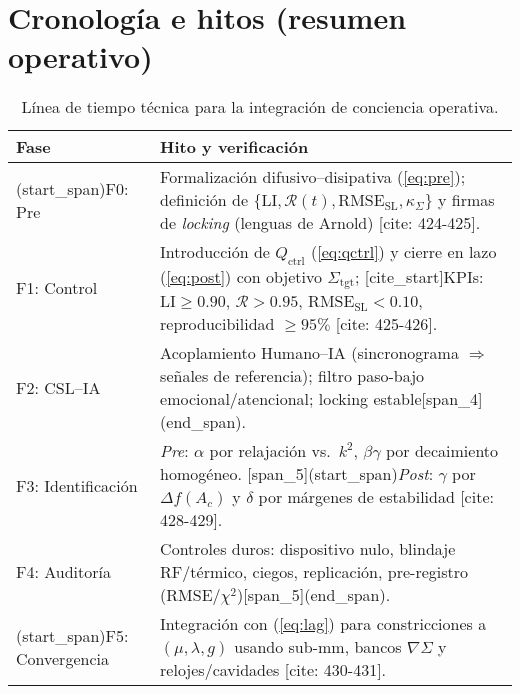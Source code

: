 \documentclass[11pt,letterpaper]{article}
\newcommand{\Sig}{\Sigma}
\newcommand{\Qctrl}{Q_{\text{ctrl}}}
\newcommand{\LI}{\mathrm{LI}}
\newcommand{\RMSESL}{\mathrm{RMSE}_{\mathrm{SL}}}
\newcommand{\RR}{\mathcal{R}}
\newcommand{\kSig}{\kappa_{\Sigma}}
\newcommand{\grad}{\nabla}
\newcommand{\Ac}{A_c}
\begin{document}
\section{Cronología e hitos (resumen operativo)}
\begin{table}[H]\centering
\renewcommand{\arraystretch}{1.15}
\begin{tabular}{@{}p{2.6cm} p{12.6cm}@{}}
\toprule
\textbf{Fase} & \textbf{Hito y verificación} \\ \midrule
[span_4](start_span)F0: Pre & Formalización difusivo--disipativa (\ref{eq:pre}); definición de $\{\LI,\RR(t),\RMSESL,\kSig\}$ y firmas de \emph{locking} (lenguas de Arnold) [cite: 424-425]. \\
F1: Control & Introducción de $\Qctrl$ (\ref{eq:qctrl}) y cierre en lazo (\ref{eq:post}) con objetivo $\Sig_{\text{tgt}}$; [cite_start]KPIs: $\LI\ge 0.90$, $\RR>0.95$, $\RMSESL<0.10$, reproducibilidad $\ge 95\%$ [cite: 425-426]. \\
[cite_start]F2: CSL--IA & Acoplamiento Humano--IA (sincronograma $\Rightarrow$ señales de referencia); filtro paso-bajo emocional/atencional; locking estable[span_4](end_span). \\
F3: Identificación & \emph{Pre}: $\alpha$ por relajación vs.\ $k^2$, $\beta\gamma$ por decaimiento homogéneo. [span_5](start_span)\emph{Post}: $\gamma$ por $\Delta f(\Ac)$ y $\delta$ por márgenes de estabilidad [cite: 428-429]. \\
[cite_start]F4: Auditoría & Controles duros: dispositivo nulo, blindaje RF/térmico, ciegos, replicación, pre-registro (RMSE/$\chi^2$)[span_5](end_span). \\
[span_6](start_span)F5: Convergencia & Integración con (\ref{eq:lag}) para constricciones a $(\mu,\lambda,g)$ usando sub-mm, bancos $\grad\Sig$ y relojes/cavidades [cite: 430-431]. \\
\bottomrule
\end{tabular}
\caption{Línea de tiempo técnica para la integración de conciencia operativa.}
\end{table}
\end{document}
